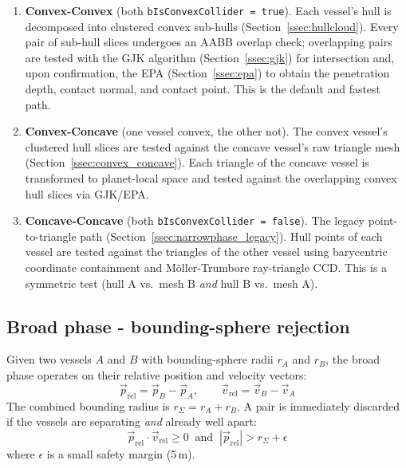 \documentclass[Orbiter Technical Reference.tex]{subfiles}
\begin{document}
\begin{enumerate}
\item \textbf{Convex-Convex} (both \texttt{bIsConvexCollider = true}).
  Each vessel's hull is decomposed into clustered convex sub-hulls
  (Section~\ref{ssec:hullcloud}).  Every pair of sub-hull slices
  undergoes an AABB overlap check; overlapping pairs are tested with
  the GJK algorithm (Section~\ref{ssec:gjk}) for intersection and,
  upon confirmation, the EPA (Section~\ref{ssec:epa}) to obtain the
  penetration depth, contact normal, and contact point.  This is the
  default and fastest path.

\item \textbf{Convex-Concave} (one vessel convex, the other not).
  The convex vessel's clustered hull slices are tested against the
  concave vessel's raw triangle mesh
  (Section~\ref{ssec:convex_concave}).  Each triangle of the concave
  vessel is transformed to planet-local space and tested against the
  overlapping convex hull slices via GJK/EPA.

\item \textbf{Concave-Concave} (both \texttt{bIsConvexCollider = false}).
  The legacy point-to-triangle path
  (Section~\ref{ssec:narrowphase_legacy}).  Hull points of each vessel
  are tested against the triangles of the other vessel using
  barycentric coordinate containment and M\"oller-Trumbore
  ray-triangle CCD.  This is a symmetric test (hull A vs.\ mesh B
  \emph{and} hull B vs.\ mesh A).
\end{enumerate}


\subsection{Broad phase - bounding-sphere rejection}
\label{ssec:broadphase}
Given two vessels $A$ and $B$ with bounding-sphere radii
$r_A$ and $r_B$, the broad phase operates on their relative position and
velocity vectors:
\begin{equation*}
\vec{p}_{\mathrm{rel}} = \vec{p}_B - \vec{p}_A, \qquad
\vec{v}_{\mathrm{rel}} = \vec{v}_B - \vec{v}_A
\end{equation*}
The combined bounding radius is $r_{\Sigma} = r_A + r_B$.
A pair is immediately discarded if the vessels are separating
\emph{and} already well apart:
\begin{equation*}
\vec{p}_{\mathrm{rel}} \cdot \vec{v}_{\mathrm{rel}} \ge 0
\;\;\text{and}\;\;
|\vec{p}_{\mathrm{rel}}| > r_{\Sigma} + \epsilon
\end{equation*}
where $\epsilon$ is a small safety margin (5\,m).
\end{document}

